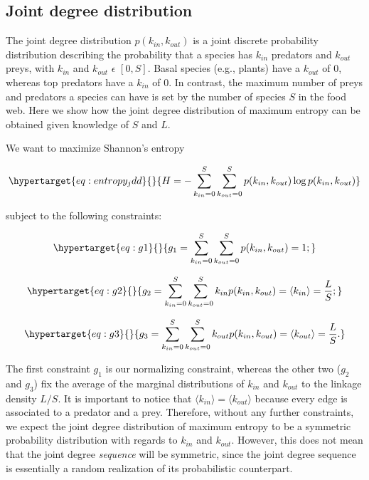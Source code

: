 \documentclass[10pt,oneside]{article}
\begin{document}
\hypertarget{joint-degree-distribution}{%
\subsection{Joint degree distribution}\label{joint-degree-distribution}}

The joint degree distribution \(p(k_{in},k_{out})\) is a joint discrete
probability distribution describing the probability that a species has
\(k_{in}\) predators and \(k_{out}\) preys, with \(k_{in}\) and
\(k_{out}\) \(\epsilon\) \([0, S]\). Basal species (e.g., plants) have a
\(k_{out}\) of \(0\), whereas top predators have a \(k_{in}\) of \(0\).
In contrast, the maximum number of preys and predators a species can
have is set by the number of species \(S\) in the food web. Here we show
how the joint degree distribution of maximum entropy can be obtained
given knowledge of \(S\) and \(L\).

We want to maximize Shannon's entropy

\begin{equation}\protect\hypertarget{eq:entropy_jdd}{}{H = -\sum_{k_{in}=0}^S\sum_{k_{out}=0}^S p(k_{in},k_{out}) \log p(k_{in},k_{out})}\label{eq:entropy_jdd}\end{equation}

subject to the following constraints:

\begin{equation}\protect\hypertarget{eq:g1}{}{g_1 = \sum_{k_{in}=0}^S\sum_{k_{out}=0}^S p(k_{in},k_{out}) = 1;}\label{eq:g1}\end{equation}

\begin{equation}\protect\hypertarget{eq:g2}{}{g_2 = \sum_{k_{in}=0}^S\sum_{k_{out}=0}^S k_{in} p(k_{in},k_{out}) = \langle k_{in} \rangle = \frac{L}{S};}\label{eq:g2}\end{equation}

\begin{equation}\protect\hypertarget{eq:g3}{}{g_3 = \sum_{k_{in}=0}^S\sum_{k_{out}=0}^S k_{out} p(k_{in},k_{out}) = \langle k_{out} \rangle = \frac{L}{S}.}\label{eq:g3}\end{equation}

The first constraint \(g_1\) is our normalizing constraint, whereas the
other two (\(g_2\) and \(g_3\)) fix the average of the marginal
distributions of \(k_{in}\) and \(k_{out}\) to the linkage density
\(L/S\). It is important to notice that
\(\langle k_{in} \rangle = \langle k_{out} \rangle\) because every edge
is associated to a predator and a prey. Therefore, without any further
constraints, we expect the joint degree distribution of maximum entropy
to be a symmetric probability distribution with regards to \(k_{in}\)
and \(k_{out}\). However, this does not mean that the joint degree
\emph{sequence} will be symmetric, since the joint degree sequence is
essentially a random realization of its probabilistic counterpart.
\end{document}
